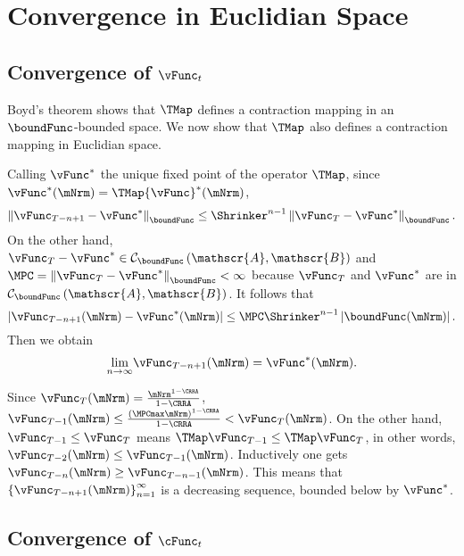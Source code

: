 \documentclass[\econtexRoot/BufferStockTheory]{subfiles}
\begin{document}
\section{Convergence in Euclidian Space}
\subsection{Convergence of
  \texorpdfstring{$\vFunc_{t}$}{vFunc-{t}}}\label{sec:vEuclidian}

Boyd's theorem shows that $\TMap$ defines a contraction mapping
in an $\boundFunc$-bounded space. We now show that $\TMap$ also
defines a contraction mapping in Euclidian space.

Calling $\vFunc^{\ast}$ the unique fixed point of the operator $\TMap$, since $\vFunc^{\ast }(\mNrm)=\TMap {\vFunc}^{\ast }(\mNrm)$,
\begin{equation}
\left\Vert \vFunc_{T-n+1}-\vFunc^{\ast }\right\Vert _{\boundFunc }\leq \Shrinker
^{n-1}\left\Vert \vFunc_{T}-\vFunc^{\ast }\right\Vert _{\boundFunc }.
\end{equation}%
On the other hand, $\vFunc_{T}-\vFunc^{\ast }\in \mathcal{C}_{\boundFunc }\left( \mathscr{A},
\mathscr{B}\right) $ and $\MPC =\left\Vert \vFunc_{T}-\vFunc^{\ast }\right\Vert_{\boundFunc }<\infty $ because $\vFunc_{T}$ and $\vFunc^{\ast }$ are in $\mathcal{C}_{\boundFunc
}\left( \mathscr{A},\mathscr{B}\right) $.
It follows that%
\begin{equation}
\left\vert \vFunc_{T-n+1}(\mNrm)-\vFunc^{\ast }(\mNrm)\right\vert \leq \MPC \Shrinker^{n-1}\left\vert \boundFunc(\mNrm)\right\vert.
\end{equation}%
Then we obtain
\begin{equation}
\underset{n\rightarrow \infty }{\lim }\vFunc_{T-n+1}(\mNrm)=\vFunc^{\ast }(\mNrm).
\end{equation}

Since $\vFunc_{T}(\mNrm)=\frac{\mNrm^{1-\CRRA }}{1-\CRRA }$, $\vFunc_{T-1}(\mNrm)\leq \frac{{\left(\MPCmax \mNrm\right)}^{1-\CRRA}}{1-\CRRA}<\vFunc_{T}(\mNrm)$.
On the other hand, $\vFunc_{T-1}\leq \vFunc_{T}$
means $\TMap\vFunc_{T-1}\leq \TMap\vFunc_{T}$, in other words, $\vFunc_{T-2}(\mNrm)\leq \vFunc_{T-1}(\mNrm)$.
Inductively one gets $\vFunc_{T-n}(\mNrm)\geq \vFunc_{T-n-1}(\mNrm)$.
This means that $\left\{
\vFunc_{T-n+1}(\mNrm)\right\} _{n=1}^{\infty }$ is a decreasing sequence,
bounded below by $\vFunc^{\ast}$.


\subsection{Convergence of \texorpdfstring{$\cFunc_{t}$}{cFunc-{t}}}\label{subsec:cConverges}%
\end{document}
